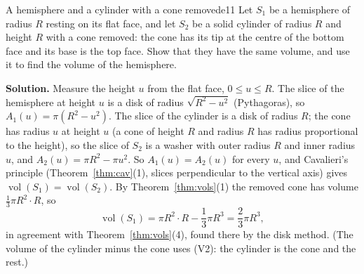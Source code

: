 \documentclass[11pt]{article}
\begin{document}
\begin{exmp}{A hemisphere and a cylinder with a cone removed}{e11}
Let $S_1$ be a hemisphere of radius $R$ resting on its flat face, and let $S_2$ be a solid cylinder of radius $R$ and height $R$ with a cone removed: the cone has its tip at the centre of the bottom face and its base is the top face. Show that they have the same volume, and use it to find the volume of the hemisphere.

\textbf{Solution.} Measure the height $u$ from the flat face, $0\le u\le R$. The slice of the hemisphere at height $u$ is a disk of radius $\sqrt{R^2-u^2}$ (Pythagoras), so $A_1(u)=\pi(R^2-u^2)$. The slice of the cylinder is a disk of radius $R$; the cone has radius $u$ at height $u$ (a cone of height $R$ and radius $R$ has radius proportional to the height), so the slice of $S_2$ is a washer with outer radius $R$ and inner radius $u$, and $A_2(u)=\pi R^2-\pi u^2$.
So $A_1(u)=A_2(u)$ for every $u$, and Cavalieri's principle (Theorem~\ref{thm:cav}(1), slices perpendicular to the vertical axis) gives $\operatorname{vol}(S_1)=\operatorname{vol}(S_2)$. By Theorem~\ref{thm:vols}(1) the removed cone has volume $\frac13\pi R^2\cdot R$, so
\[
\operatorname{vol}(S_1)=\pi R^2\cdot R-\frac13\pi R^3=\frac23\pi R^3,
\]
in agreement with Theorem~\ref{thm:vols}(4), found there by the disk method. (The volume of the cylinder minus the cone uses (V2): the cylinder is the cone and the rest.)


\end{exmp}
\end{document}
